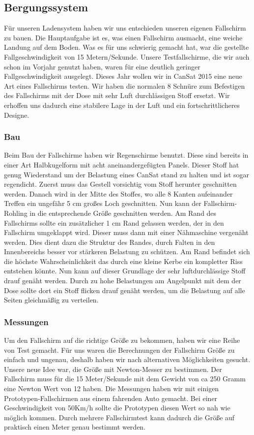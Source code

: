 \subsection{Bergungssystem}
Für unseren Ladensystem haben wir uns entschieden unseren eigenen Fallschirm zu bauen. Die Hauptaufgabe ist es, was einen Fallschirm ausmacht, eine weiche Landung auf dem Boden. Was es für uns schwierig gemacht hat, war die gestellte Fallgeschwindigkeit von 15 Metern/Sekunde. Unsere Testfallschirme, die wir auch schon im Vorjahr genutzt haben, waren für eine deutlich geringer Fallgeschwindigkeit ausgelegt. Dieses Jahr wollen wir in CanSat 2015 eine neue Art eines Fallschirms testen. Wir haben die normalen 8 Schnüre zum Befestigen des Fallschirms mit der Dose mit sehr Luft durchlässigen Stoff ersetzt. Wir erhoffen uns dadurch eine stabilere Lage in der Luft und ein fortschrittlicheres Designe.

	\subsubsection{Bau}
	Beim Bau der Fallschirme haben wir Regenschirme benutzt. Diese sind bereits in einer Art Halbkugelform mit acht aneinandergefügten Panels. Dieser Stoff hat genug Wiederstand um der Belastung eines CanSat stand zu halten und ist sogar regendicht. Zuerst muss das Gestell vorsichtig vom Stoff herunter geschnitten werden. Danach wird in der Mitte des Stoffes, wo alle 8 Kanten aufeinander Treffen ein ungefähr 5 cm großes Loch geschnitten. Nun kann der Fallschirm-Rohling in die entsprechende Größe geschnitten werden. Am Rand des Fallschirms sollte ein zusätzlicher 1 cm Rand gelassen werden, der in den Fallschirm umgeklappt wird. Dieser muss dann mit einer Nähmaschine vergenäht werden. Dies dient dazu die Struktur des Randes, durch Falten in den Innenbereichs besser vor stärkeren Belastung zu schützen. Am Rand befindet sich die höchste Wahrscheinlichkeit das durch eine kleine Kerbe ein kompletter Riss entstehen könnte. Nun kann auf dieser Grundlage der sehr luftdurchlässige Stoff drauf genäht werden. Durch zu hohe Belastungen am Angelpunkt mit dem der Dose sollte dort ein Stoff flicken drauf genäht werden, um die Belastung auf alle Seiten gleichmäßig zu verteilen.

	\subsubsection{Messungen}
	Um den Fallschirm auf die richtige Größe zu bekommen, haben wir eine Reihe von Test gemacht. Für uns waren die Berechnungen der Fallschirm Größe zu einfach und ungenau, deshalb haben wir nach alternativen Möglichkeiten gesucht. Unsere neue Idee war, die Größe mit Newton-Messer zu bestimmen. Der Fallschirm muss für die 15 Meter/Sekunde mit dem Gewicht von ca 250 Gramm eine Newton Wert von 12 haben. Die Messungen haben wir mit einigen Prototypen-Fallschirmen aus einem fahrenden Auto gemacht. Bei einer Geschwindigkeit von 50Km/h sollte die Prototypen diesen Wert so nah wie möglich kommen. Durch mehrere Fallschirmtest kann dadurch die Größe auf praktisch einen Meter genau bestimmt werden.  